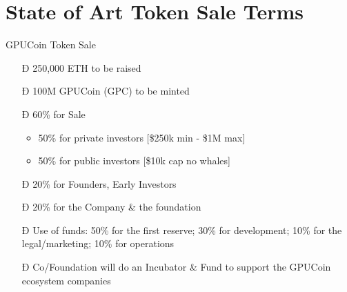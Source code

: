 \section{State of Art Token Sale Terms}
\begin{frame}[fragile]{GPUCoin Token Sale }


 \begin{itemize}[<+-| alert@+>]%

\item[Ð]{250,000 ETH to be raised}
\item[Ð]100M GPUCoin (GPC) to be minted
\item[Ð]60\% for Sale
\begin{itemize}[<+-| alert@+>]
\item 50\% for private investors [\$250k min - \$1M max]
\item 50\% for public investors [\$10k cap no whales]
\end{itemize}
\item[Ð]{20\% for Founders, Early Investors}
\item[Ð]{20\% for the Company \& the foundation}
\item[Ð]{Use of funds: 50\% for the first reserve; 30\% for development; 10\% for the legal/marketing; 10\% for operations}
\item[Ð]{Co/Foundation will do an Incubator \& Fund to support the GPUCoin ecosystem companies}
\end{itemize}

\end{frame}
